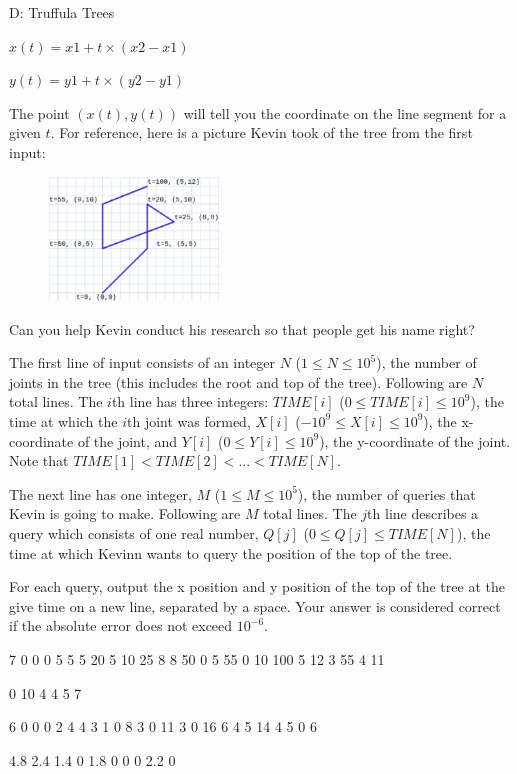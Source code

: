 \begin{problem}{D: Truffula Trees}
\begin{center}
$x(t) = x1 + t \times (x2 - x1)$

$y(t) = y1 + t \times (y2 - y1)$
\end{center}

The point $(x(t), y(t))$ will tell you the coordinate on the line segment for a given $t$. For reference, here is a picture Kevin took of the tree from the first input:

\begin{figure}[h]
    \centering
    \includegraphics[width=0.4\textwidth]{tree.eps}
\end{figure}

Can you help Kevin conduct his research so that people get his name right?

\end{problem}

\begin{formalin}
The first line of input consists of an integer $N$ ($1 \leq N \leq 10^{5}$), the number of joints in the tree (this includes the root and top of the tree). Following are $N$ total lines. The $i$th line has three integers: $TIME[i]$ ($0 \le TIME[i] \le 10^{9}$), the time at which the $i$th joint was formed, $X[i]$ ($-10^{9} \leq X[i] \leq 10^{9}$), the x-coordinate of the joint, and $Y[i]$ ($0 \leq Y[i] \leq 10^{9}$), the y-coordinate of the joint. Note that $TIME[1] < TIME[2] < ... < TIME[N]$.

The next line has one integer, $M$ ($1 \leq M \leq 10^{5}$), the number of queries that Kevin is going to make. Following are $M$ total lines. The $j$th line describes a query which consists of one real number, $Q[j]$ ($0 \leq Q[j] \leq TIME[N]$), the time at which Kevinn wants to query the position of the top of the tree.
\end{formalin}

\begin{formalout}
For each query, output the x position and y position of the top of the tree at the give time on a new line, separated by a space. Your answer is considered correct if the absolute error does not exceed $10^{-6}$.
\end{formalout}

\begin{datain}
7
0 0 0
5 5 5
20 5 10
25 8 8
50 0 5
55 0 10
100 5 12
3
55
4
11
\end{datain}
\begin{dataout}
0 10
4 4
5 7
\end{dataout}

\begin{datain}
6
0 0 0
2 4 4
3 1 0
8 3 0
11 3 0
16 6 4
5
14
4
5
0
6
\end{datain}
\begin{dataout}
4.8 2.4
1.4 0
1.8 0
0 0
2.2 0
\end{dataout}
